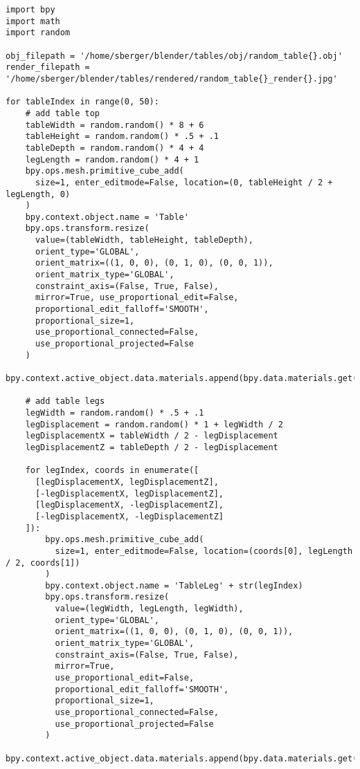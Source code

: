 \begin{lstlisting}
import bpy
import math
import random

obj_filepath = '/home/sberger/blender/tables/obj/random_table{}.obj'
render_filepath = '/home/sberger/blender/tables/rendered/random_table{}_render{}.jpg'

for tableIndex in range(0, 50):
    # add table top
    tableWidth = random.random() * 8 + 6
    tableHeight = random.random() * .5 + .1
    tableDepth = random.random() * 4 + 4
    legLength = random.random() * 4 + 1
    bpy.ops.mesh.primitive_cube_add(
      size=1, enter_editmode=False, location=(0, tableHeight / 2 + legLength, 0)
    )
    bpy.context.object.name = 'Table'
    bpy.ops.transform.resize(
      value=(tableWidth, tableHeight, tableDepth),
      orient_type='GLOBAL',
      orient_matrix=((1, 0, 0), (0, 1, 0), (0, 0, 1)),
      orient_matrix_type='GLOBAL',
      constraint_axis=(False, True, False),
      mirror=True, use_proportional_edit=False,
      proportional_edit_falloff='SMOOTH',
      proportional_size=1,
      use_proportional_connected=False,
      use_proportional_projected=False
    )
    bpy.context.active_object.data.materials.append(bpy.data.materials.get("Wood"))

    # add table legs
    legWidth = random.random() * .5 + .1
    legDisplacement = random.random() * 1 + legWidth / 2
    legDisplacementX = tableWidth / 2 - legDisplacement
    legDisplacementZ = tableDepth / 2 - legDisplacement

    for legIndex, coords in enumerate([
      [legDisplacementX, legDisplacementZ],
      [-legDisplacementX, legDisplacementZ],
      [legDisplacementX, -legDisplacementZ],
      [-legDisplacementX, -legDisplacementZ]
    ]):
        bpy.ops.mesh.primitive_cube_add(
          size=1, enter_editmode=False, location=(coords[0], legLength / 2, coords[1])
        )
        bpy.context.object.name = 'TableLeg' + str(legIndex)
        bpy.ops.transform.resize(
          value=(legWidth, legLength, legWidth),
          orient_type='GLOBAL',
          orient_matrix=((1, 0, 0), (0, 1, 0), (0, 0, 1)),
          orient_matrix_type='GLOBAL',
          constraint_axis=(False, True, False),
          mirror=True,
          use_proportional_edit=False,
          proportional_edit_falloff='SMOOTH',
          proportional_size=1,
          use_proportional_connected=False,
          use_proportional_projected=False
        )
        bpy.context.active_object.data.materials.append(bpy.data.materials.get("Wood"))


\end{lstlisting}
